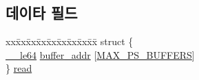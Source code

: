 \subsection*{데이타 필드}
\begin{DoxyCompactItemize}
\item 
\begin{tabbing}
xx\=xx\=xx\=xx\=xx\=xx\=xx\=xx\=xx\=\kill
struct \{\\
\>\hyperlink{lib_2igb_2e1000__osdep_8h_a082a2c540152aca8c135a709aa7d228f}{\_\_le64} \hyperlink{unione1000__rx__desc__packet__split_ab9b8995544ff890be0e6f3ff23e2be16}{buffer\_addr} \mbox{[}\hyperlink{lib_2igb_2e1000__hw_8h_a2804dae9a32983a6e9001f4a1c7aa174}{MAX\_PS\_BUFFERS}\mbox{]}\\
\} \hyperlink{unione1000__rx__desc__packet__split_a2597ade145d9b31307f972f7ab71ada0}{read}\\


\end{tabbing}
\end{DoxyCompactItemize}
